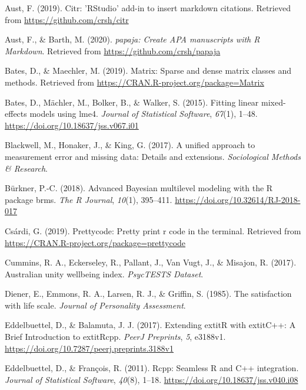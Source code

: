 \documentclass[
  english,
  man,floatsintext]{apa6}
\begin{document}
\leavevmode\hypertarget{ref-R-citr}{}%
Aust, F. (2019). Citr: 'RStudio' add-in to insert markdown citations. Retrieved from \url{https://github.com/crsh/citr}

\leavevmode\hypertarget{ref-R-papaja}{}%
Aust, F., \& Barth, M. (2020). \emph{papaja: Create APA manuscripts with R Markdown}. Retrieved from \url{https://github.com/crsh/papaja}

\leavevmode\hypertarget{ref-R-Matrix}{}%
Bates, D., \& Maechler, M. (2019). Matrix: Sparse and dense matrix classes and methods. Retrieved from \url{https://CRAN.R-project.org/package=Matrix}

\leavevmode\hypertarget{ref-R-lme4}{}%
Bates, D., Mächler, M., Bolker, B., \& Walker, S. (2015). Fitting linear mixed-effects models using lme4. \emph{Journal of Statistical Software}, \emph{67}(1), 1--48. \url{https://doi.org/10.18637/jss.v067.i01}

\leavevmode\hypertarget{ref-Blackwell2017-oq}{}%
Blackwell, M., Honaker, J., \& King, G. (2017). A unified approach to measurement error and missing data: Details and extensions. \emph{Sociological Methods \& Research}.

\leavevmode\hypertarget{ref-BRMSpackage}{}%
Bürkner, P.-C. (2018). Advanced Bayesian multilevel modeling with the R package brms. \emph{The R Journal}, \emph{10}(1), 395--411. \url{https://doi.org/10.32614/RJ-2018-017}

\leavevmode\hypertarget{ref-R-prettycode}{}%
Csárdi, G. (2019). Prettycode: Pretty print r code in the terminal. Retrieved from \url{https://CRAN.R-project.org/package=prettycode}

\leavevmode\hypertarget{ref-Cummins2017-ur}{}%
Cummins, R. A., Eckerseley, R., Pallant, J., Van Vugt, J., \& Misajon, R. (2017). Australian unity wellbeing index. \emph{PsycTESTS Dataset}.

\leavevmode\hypertarget{ref-Diener1985-xy}{}%
Diener, E., Emmons, R. A., Larsen, R. J., \& Griffin, S. (1985). The satisfaction with life scale. \emph{Journal of Personality Assessment}.

\leavevmode\hypertarget{ref-R-Rcpp_b}{}%
Eddelbuettel, D., \& Balamuta, J. J. (2017). Extending extitR with extitC++: A Brief Introduction to extitRcpp. \emph{PeerJ Preprints}, \emph{5}, e3188v1. \url{https://doi.org/10.7287/peerj.preprints.3188v1}

\leavevmode\hypertarget{ref-R-Rcpp_a}{}%
Eddelbuettel, D., \& François, R. (2011). Rcpp: Seamless R and C++ integration. \emph{Journal of Statistical Software}, \emph{40}(8), 1--18. \url{https://doi.org/10.18637/jss.v040.i08}
\end{document}
